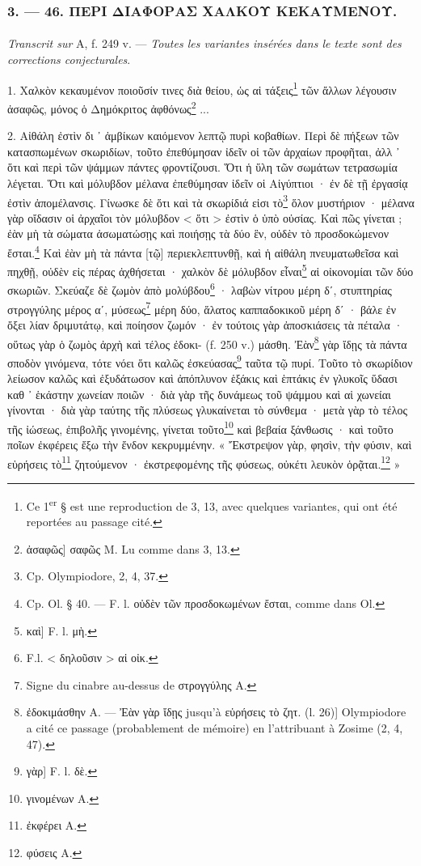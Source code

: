 \documentclass[a4paper, 11pt, oneside, polutonikogreek, french]{article}
\begin{document}
\bigskip
\centerline{\EightStarTaper}
\centerline{\EightStarTaper\EightStarTaper}
\bigskip

\subsubsection{3. --- 46. ΠΕΡΙ ΔΙΑΦΟΡΑΣ ΧΑΛΚΟΥ ΚΕΚΑΥΜΕΝΟΥ.}
\paragraph{}
\emph{Transcrit sur} A, f. 249 v. --- \emph{Toutes les variantes insérées dans le texte sont des corrections conjecturales}.

\bigskip

1. Χαλκὸν κεκαυμένον ποιοῦσίν τινες διὰ θείου, ὡς αἱ τάξεις\footnote{Ce 1\textsuperscript{er} § est une reproduction de 3, 13, avec quelques variantes, qui ont été reportées au passage cité.} τῶν ἄλλων λέγουσιν ἀσαφῶς, μόνος ὁ Δημόκριτος ἀφθόνως\footnote{ἀσαφῶς] σαφῶς M. Lu comme dans 3, 13.} ...

2. Αἰθάλη ἐστὶν δι ᾽ ἀμβίκων καιόμενον λεπτῷ πυρὶ κοβαθίων. Περὶ δὲ πήξεων τῶν κατασπωμένων σκωριδίων, τοῦτο ἐπεθύμησαν ἰδεῖν οἱ τῶν ἀρχαίων προφῆται, ἀλλ ᾽ ὅτι καὶ περὶ τῶν ψάμμων πάντες φροντίζουσι. Ὅτι ἡ ὕλη τῶν σωμάτων τετρασωμία λέγεται. Ὅτι καὶ μόλυβδον μέλανα ἐπεθύμησαν ἰδεῖν οἱ Αἰγύπτιοι · ἐν δὲ τῇ ἐργασίᾳ ἐστὶν ἀπομέλανσις. Γίνωσκε δὲ ὅτι καὶ τὰ σκωρίδιά εἰσι τὸ\footnote{Cp. Olympiodore, 2, 4, 37.} ὅλον μυστήριον · μέλανα γὰρ οἴδασιν οἱ ἀρχαῖοι τὸν μόλυβδον < ὅτι > ἐστὶν ὁ ὑπὸ οὐσίας. Καὶ πῶς γίνεται ; ἐὰν μὴ τὰ σώματα ἀσωματώσῃς καὶ ποιήσῃς τὰ δύο ἓν, οὐδὲν τὸ προσδοκώμενον ἔσται.\footnote{Cp. Ol. § 40. --- F. l. οὐδὲν τῶν προσδοκωμένων ἔσται, comme dans Ol.} Καὶ ἐὰν μὴ τὰ πάντα [τῷ] περιεκλεπτυνθῇ, καὶ ἡ αἰθάλη πνευματωθεῖσα καὶ πηχθῇ, οὐδὲν εἰς πέρας ἀχθήσεται · χαλκὸν δὲ μόλυβδον εἶναι\footnote{καὶ] F. l. μὴ.} αἱ οἰκονομίαι τῶν δύο σκωριῶν. Σκεύαζε δὲ ζωμὸν ἀπὸ μολύβδου\footnote{F.l. < δηλοῦσιν > αἱ οἰκ.} · λαβὼν νίτρου μέρη δʹ, στυπτηρίας στρογγύλης μέρος αʹ, μύσεως\footnote{Signe du cinabre au-dessus de στρογγύλης A.} μέρη δύο, ἅλατος καππαδοκικοῦ μέρη δʹ · βάλε ἐν ὄξει λίαν δριμυτάτῳ, καὶ ποίησον ζωμόν · ἐν τούτοις γὰρ ἀποσκιάσεις τὰ πέταλα · οὕτως γὰρ ὁ ζωμὸς ἀρχὴ καὶ τέλος ἐδοκι- (f. 250 v.) μάσθη. Ἐὰν\footnote{ἐδοκιμάσθην A. --- Ἐὰν γὰρ ἴδῃς jusqu'à εὑρήσεις τὸ ζητ. (l. 26)] Olympiodore a cité ce passage (probablement de mémoire) en l'attribuant à Zosime (2, 4, 47).} γὰρ ἴδῃς τὰ πάντα σποδὸν γινόμενα, τότε νόει ὅτι καλῶς ἐσκεύασας\footnote{γὰρ] F. l. δὲ.} ταῦτα τῷ πυρί. Τοῦτο τὸ σκωρίδιον λείωσον καλῶς καὶ ἐξυδάτωσον καὶ ἀπόπλυνον ἑξάκις καὶ ἑπτάκις ἐν γλυκοῖς ὕδασι καθ ᾽ ἑκάστην χωνείαν ποιῶν · διὰ γὰρ τῆς δυνάμεως τοῦ ψάμμου καὶ αἱ χωνείαι γίνονται · διὰ γὰρ ταύτης τῆς πλύσεως γλυκαίνεται τὸ σύνθεμα · μετὰ γὰρ τὸ τέλος τῆς ἰώσεως, ἐπιβολῆς γινομένης, γίνεται τοῦτο\footnote{γινομένων A.} καὶ βεβαία ξάνθωσις · καὶ τοῦτο ποῖων ἐκφέρεις ἔξω τὴν ἔνδον κεκρυμμένην. « Ἔκστρεψον γὰρ, φησὶν, τὴν φύσιν, καὶ εὑρήσεις τὸ\footnote{ἐκφέρει A.} ζητούμενον · ἐκστρεφομένης τῆς φύσεως, οὐκέτι λευκὸν ὁρᾷται.\footnote{φύσεις A.} »
\end{document}
